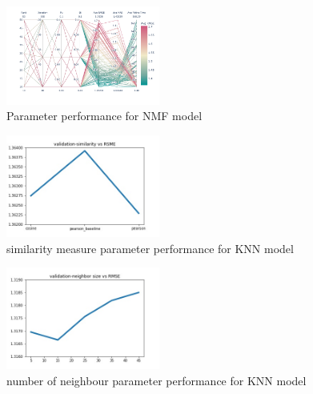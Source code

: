 \documentclass[journal]{IEEEtran}
\begin{document}
\begin{figure}
\begin {center}
\includegraphics[width=0.45\textwidth]{images/nmfplot.png}
\caption{Parameter performance for NMF model}
\label{fig:nmfy}
\end {center}
\end{figure}
\begin{figure}
\begin {center}
\includegraphics[width=0.45\textwidth]{images/similarity.jpg}
\caption{similarity measure parameter performance for KNN model}
\label{fig:nmfy}
\end {center}
\end{figure}
\begin{figure}
\begin {center}
\includegraphics[width=0.45\textwidth]{images/neighbour.jpg}
\caption{number of neighbour parameter performance for KNN model}
\label{fig:nmfy}
\end {center}
\end{figure}
\end{document}
